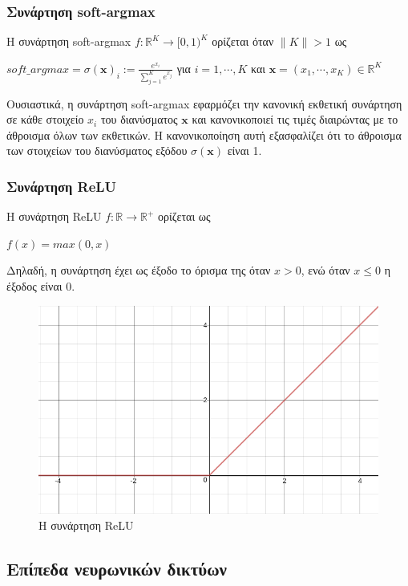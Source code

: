 \subsubsection{Συνάρτηση soft-argmax}
\label{definition:soft-argmax}
Η συνάρτηση soft-argmax \(f: \mathbb{R}^K  \rightarrow [0, 1)^K\) ορίζεται όταν \(\lVert K \rVert > 1\) ως

\(soft\_argmax = \sigma(\boldsymbol{x})_i := \frac{e^{x_i}}{\sum_{j=1}^{K}e^{x_j}}\) για \(i = 1,\cdots,K\) και \(\boldsymbol{x} = (x_1,\cdots,x_K) \in \mathbb{R}^K \)


Ουσιαστικά, η συνάρτηση soft-argmax εφαρμόζει την κανονική εκθετική συνάρτηση σε κάθε στοιχείο \(x_i\) του διανύσματος \(\boldsymbol{x}\) και κανονικοποιεί τις τιμές διαιρώντας με το άθροισμα όλων των εκθετικών. Η κανονικοποίηση αυτή εξασφαλίζει ότι το άθροισμα των στοιχείων του διανύσματος εξόδου \(\sigma(\boldsymbol{x})\) είναι 1.

\subsubsection{Συνάρτηση ReLU}
\label{definition:relu}
Η συνάρτηση ReLU \(f: \mathbb{R} \rightarrow \mathbb{R}^+ \) ορίζεται ως

\( f(x) = max(0, x) \)

Δηλαδή, η συνάρτηση έχει ως έξοδο το όρισμα της όταν \(x > 0\), ενώ όταν \(x \leq 0\) η έξοδος είναι 0.

\begin{figure}[H]
	\centering
	\includegraphics[scale=0.5]{images/appendix/relu_function.png}
	\caption{H συνάρτηση ReLU}
\end{figure}
\newpage
\subsection{Επίπεδα νευρωνικών δικτύων}
\label{sec:nn_layers}

